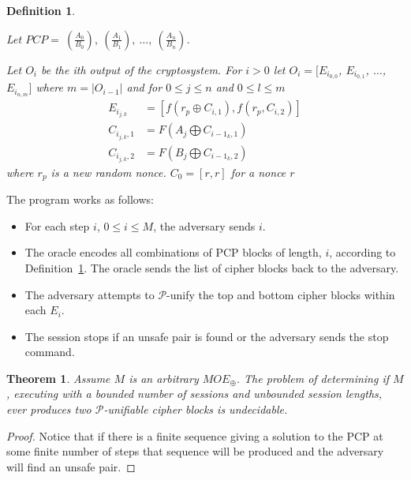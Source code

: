 \documentclass{easychair}
\newtheorem{definition}{Definition}
\newtheorem{theorem}{Theorem}
\begin{document}
\begin{definition}\label{det-func}
	
	Let $PCP = ~(\frac{A_0}{B_0}), ~(\frac{A_1}{B_1}), ~\ldots, ~(\frac{A_n}{B_n})$. 	
	
	Let $O_i$ be the ith output of the cryptosystem. 
	For $i > 0$ let $O_i = [E_{i_{0,0}}$, $E_{i_{0,1}}$, $\ldots$,
	$E_{i_{n,m}}]$ where $m = |O_{i-1}|$ and for 
	$0 \leq j \leq n$ and $0 \leq l \leq m$
	\begin{align*}
	E_{i_{j,k}} &= [f(r_p \oplus C_{i, 1}), f(r_p, C_{i,2}) ] \\
	C_{i_{j,k},1} &= F(A_j \bigoplus C_{i-1_{k}, 1})	\\
	C_{i_{j,k},2} &= F(B_j \bigoplus C_{i-1_{k}, 2}) 
	\end{align*}
	where $r_p$ is a new random nonce.
	$C_0 = [r,r]$ for a nonce $r$
\end{definition}
 
The program works as follows:
\begin{itemize}
	\item For each step $i$, $0 \leq i \leq M$, the adversary
	sends $i$.
	\item The oracle encodes all combinations of PCP blocks
	of length, $i$, according to Definition~\ref{det-func}.
	The oracle sends the list of cipher blocks back to
	the adversary.
	\item The adversary attempts to $\mathcal{P}$-unify 
	the top and bottom cipher blocks within each $E_i$.
	\item The session stops if an unsafe pair is found or 
	the adversary sends the stop command. 
\end{itemize}

\begin{theorem}
	Assume $M$ is an arbitrary $MOE_{\oplus}$. The problem
	of determining if $M$, executing with 
	a bounded number of sessions and unbounded session
	lengths, ever produces two  $\mathcal{P}$-unifiable cipher blocks is undecidable. 
\end{theorem}
\begin{proof}
	Notice that if there is a finite sequence giving a solution
	to the PCP at some finite number of steps that sequence will
	be produced and the adversary will find an unsafe pair.  
\end{proof}
\end{document}
